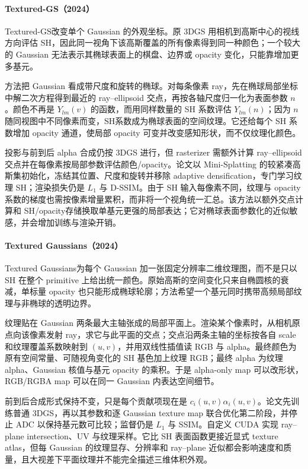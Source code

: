 \paragraph{Textured-GS（2024）\cite{2407_09733}}
Textured-GS改变单个 Gaussian 的外观坐标。原 3DGS 用相机到高斯中心的视线方向评估 SH，因此同一视角下该高斯覆盖的所有像素得到同一种颜色；一个较大的 Gaussian 无法表示其椭球表面上的棋盘、边界或 opacity 变化，只能靠增加更多基元。

方法把 Gaussian 看成带尺度和旋转的椭球。对每条像素 ray，先在椭球局部坐标中解二次方程得到最近的 ray--ellipsoid 交点，再按各轴尺度归一化为表面参数 $n$。颜色不再是 $Y_{lm}(v)$ 的函数，而用同样数量的 SH 系数评估 $Y_{lm}(n)$；因为 $n$ 随同视图中不同像素而变，SH系数成为椭球表面的空间纹理。它还给每个 SH 系数增加 opacity 通道，使局部 opacity 可变并改变感知形状，而不仅纹理化颜色。

投影与前到后 alpha 合成仍按 3DGS 进行，但 rasterizer 需额外计算 ray--ellipsoid 交点并在每像素按局部参数评估颜色/opacity。论文以 Mini-Splatting 的较紧凑高斯集初始化，冻结其位置、尺度和旋转并移除 adaptive densification，专门学习纹理 SH；渲染损失仍是 $L_1$ 与 D-SSIM。由于 SH 输入每像素不同，纹理与 opacity 系数的梯度也需按像素增量累积，而非将一个视角统一汇总。该方法以额外交点计算和 SH/opacity存储换取单基元更强的局部表达；它对椭球表面参数化的近似敏感，并会增加训练与渲染开销。

\paragraph{Textured Gaussians（2024）\cite{2411_18625}}
Textured Gaussians为每个 Gaussian 加一张固定分辨率二维纹理图，而不是只以 SH 在整个 primitive 上给出统一颜色。原始高斯的空间变化只来自椭圆核的衰减，单标量 opacity 也只能形成椭球轮廓；方法希望一个基元同时携带高频局部纹理与非椭球的透明边界。

纹理贴在 Gaussian 两条最大主轴张成的局部平面上。渲染某个像素时，从相机原点向该像素发射 ray，求它与此平面的交点；交点沿两条主轴的坐标按各自 scale 和纹理覆盖系数映射到 $(u,v)$，并用双线性插值读 RGB 与 alpha。最终颜色为原有空间常量、可随视角变化的 SH 基色加上纹理 RGB；最终 alpha 为纹理 alpha、Gaussian 核值与基元 opacity 的乘积。于是 alpha-only map 可以改形状，RGB/RGBA map 可以在同一 Gaussian 内表达空间细节。

前到后合成形式保持不变，只是每个贡献项现在是 $c_i(u,v)\alpha_i(u,v)$。论文先训练普通 3DGS，再以其参数和逐 Gaussian texture map 联合优化第二阶段，并停止 ADC 以保持基元数可比较；监督仍是 $L_1$ 与 SSIM。自定义 CUDA 实现 ray--plane intersection、UV 与纹理采样。它比 SH 表面函数更接近显式 texture atlas，但每 Gaussian 的纹理显存、分辨率和 ray--plane 近似都会影响速度和质量，且大视差下平面纹理并不能完全描述三维体积外观。

